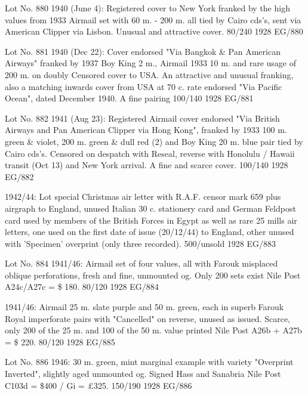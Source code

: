 \documentclass[justified]{tufte-book}
\begin{document}
%
{Lot No. 880
1940 (June 4): Registered cover to New York franked by the high values from 1933 Airmail set with 60 m. - 200 m. all tied by Cairo cds's, sent via American Clipper via Lisbon. Unusual and attractive cover.  80/240}%
{1928}%
{EG/880}%
{}%
{}
{}%
{}


%
{Lot No. 881
1940 (Dec 22): Cover endorsed "Via Bangkok \& Pan American Airways" franked by 1937 Boy King 2 m., Airmail 1933 10 m. and rare usage of 200 m. on doubly Censored cover to USA. An attractive and unusual franking, also a matching inwards cover from USA at 70 c. rate endorsed "Via Pacific Ocean", dated December 1940. A fine pairing  100/140}%
{1928}%
{EG/881}%
{}%
{}
{}%
{}

%
{Lot No. 882
1941 (Aug 23): Registered Airmail cover endorsed "Via British Airways and Pan American Clipper via Hong Kong", franked by 1933 100 m. green \& violet, 200 m. green \& dull red (2) and Boy King 20 m. blue pair tied by Cairo cds's. Censored on despatch with Reseal, reverse with Honolulu / Hawaii transit (Oct 13) and New York arrival. A fine and scarce cover.  100/140 }%
{1928}%
{EG/882}%
{}%
{}
{}%
{}


%
{1942/44: Lot special Christmas air letter with R.A.F. censor mark 659 plus airgraph to England, unused Italian 30 c. stationery card and German Feldpost card used by members of the British Forces in Egypt as well as rare 25 mills air letters, one used on the first date of issue (20/12/44) to England, other unused with 'Specimen' overprint (only three recorded).  500/unsold}%
{1928}%
{EG/883}%
{}%
{}
{}%
{}

%
{Lot No. 884
1941/46: Airmail set of four values, all with Farouk misplaced oblique perforations, fresh and fine, unmounted og. Only 200 sets exist Nile Post A24c/A27c = \$ 180.  80/120}%
{1928}%
{EG/884}%
{}%
{}
{}%
{}

%
{1941/46: Airmail 25 m. slate purple and 50 m. green, each in superb Farouk Royal imperforate pairs with "Cancelled" on reverse, unused as issued. Scarce, only 200 of the 25 m. and 100 of the 50 m. value printed Nile Post A26b + A27b = \$ 220.  80/120}%
{1928}%
{EG/885}%
{}%
{}
{}%
{}

%
{Lot No. 886
1946: 30 m. green, mint marginal example with variety "Overprint Inverted", slightly aged unmounted og. Signed Hass and Sanabria Nile Post C103d = \$400 / Gi = \pounds{325}.  150/190}%
{1928}%
{EG/886}%
{}%
{}
{}%
{}
\end{document}
